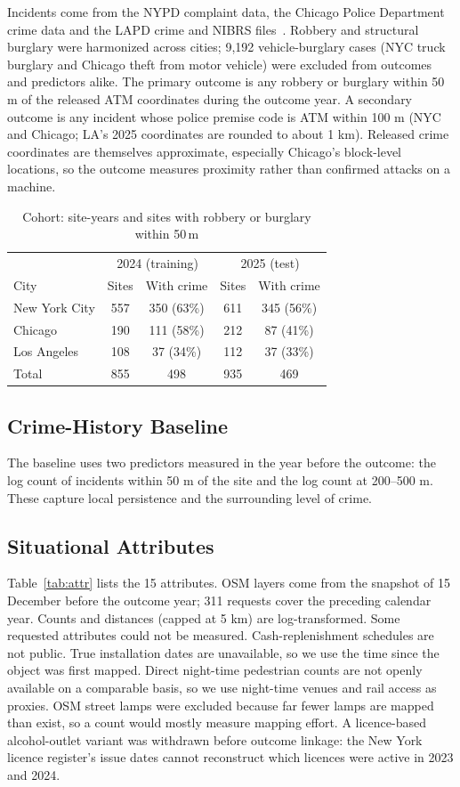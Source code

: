 \documentclass[conference]{IEEEtran}
\begin{document}
Incidents come from the NYPD complaint data, the Chicago Police Department crime data and the LAPD crime and NIBRS
files~\cite{nycopen,chiopen,laopen}. Robbery and structural burglary were harmonized across cities; 9,192
vehicle-burglary cases (NYC truck burglary and Chicago theft from motor vehicle) were excluded from outcomes and
predictors alike. The primary outcome is any robbery or burglary within 50 m of the released ATM coordinates during
the outcome year. A secondary outcome is any incident whose police premise code is ATM within 100 m (NYC and Chicago;
LA's 2025 coordinates are rounded to about 1 km). Released crime coordinates are themselves approximate, especially
Chicago's block-level locations, so the outcome measures proximity rather than confirmed attacks on a machine.

\begin{table}[t]
\caption{Cohort: site-years and sites with robbery or burglary within 50\,m}
\label{tab:cohort}
\centering
\begin{tabular}{lcccc}
\toprule
& \multicolumn{2}{c}{2024 (training)} & \multicolumn{2}{c}{2025 (test)} \\
City & Sites & With crime & Sites & With crime \\
\midrule
New York City & 557 & 350 (63\%) & 611 & 345 (56\%) \\
Chicago & 190 & 111 (58\%) & 212 & 87 (41\%) \\
Los Angeles & 108 & 37 (34\%) & 112 & 37 (33\%) \\
\midrule
Total & 855 & 498 & 935 & 469 \\
\bottomrule
\end{tabular}
\end{table}

\subsection{Crime-History Baseline}
The baseline uses two predictors measured in the year before the outcome: the log count of incidents within 50 m of
the site and the log count at 200--500 m. These capture local persistence and the surrounding level of crime.

\subsection{Situational Attributes}
Table~\ref{tab:attr} lists the 15 attributes. OSM layers come from the snapshot of 15 December before the outcome
year; 311 requests cover the preceding calendar year. Counts and distances (capped at 5 km) are log-transformed.
Some requested attributes could not be measured. Cash-replenishment schedules are not public. True installation
dates are unavailable, so we use the time since the object was first mapped. Direct night-time pedestrian counts
are not openly available on a comparable basis, so we use night-time venues and rail access as proxies. OSM street
lamps were excluded because far fewer lamps are mapped than exist, so a count would mostly measure mapping effort.
A licence-based alcohol-outlet variant was withdrawn before outcome linkage: the New York licence register's issue
dates cannot reconstruct which licences were active in 2023 and 2024.
\end{document}
